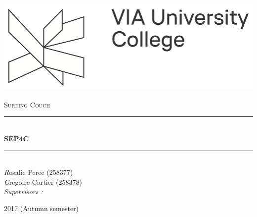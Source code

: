 \newcommand{\HRule}{\rule{\linewidth}{0.5mm}}

\begin{titlepage}
  \begin{sffamily}
  \begin{center}

    \includegraphics[scale=0.7]{via_logo.png}~\\[1.5cm]

    \textsc{\Large Surfing Couch }\\[1cm]

    \HRule \\[0.4cm]
    { \huge \bfseries SEP4C\\[0.4cm] }

    \HRule \\[1.5cm]
    
    \Large\emph Rosalie Peree \textsc{(258377)}\\
    \Large\emph Gregoire Cartier \textsc{(258378)}\\

    \Large\emph{Supervisors :} \textsc{}\\


    \vfill

    {\large 2017 (Autumn semester)}

  \end{center}
  \end{sffamily}
\end{titlepage}